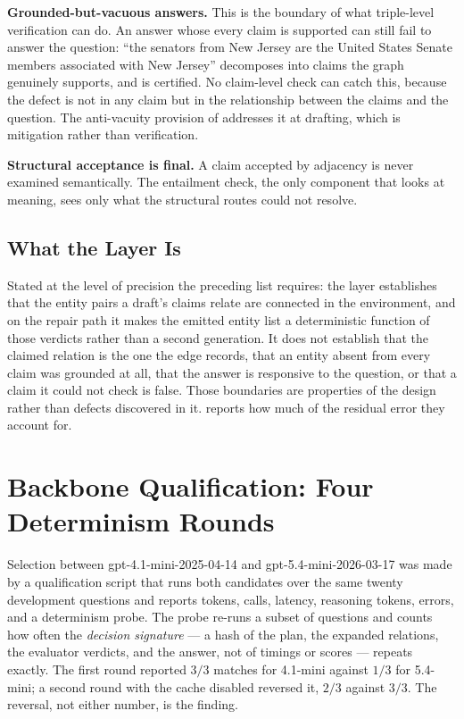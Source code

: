 \textbf{Grounded-but-vacuous answers.} This is the boundary of what triple-level
verification can do. An answer whose every claim is supported can still fail to
answer the question: ``the senators from New Jersey are the United States Senate
members associated with New Jersey'' decomposes into claims the graph genuinely
supports, and is certified. No claim-level check can catch this, because the
defect is not in any claim but in the relationship between the claims and the
question. The anti-vacuity provision of  addresses
it at drafting, which is mitigation rather than verification.

\textbf{Structural acceptance is final.} A claim accepted by adjacency is never
examined semantically. The entailment check, the only component that looks at
meaning, sees only what the structural routes could not resolve.

\subsection*{What the Layer Is}

Stated at the level of precision the preceding list requires: the layer
establishes that the entity pairs a draft's claims relate are connected in the
environment, and on the repair path it makes the emitted entity list a
deterministic function of those verdicts rather than a second generation. It
does not establish that the claimed relation is the one the edge records, that
an entity absent from every claim was grounded at all, that the answer is
responsive to the question, or that a claim it could not check is false. Those
boundaries are properties of the design rather than defects discovered in it.
 reports how much of the residual error they account
for.


\section{Backbone Qualification: Four Determinism Rounds}\label{app:backbone}

Selection between \textsf{gpt-4.1-mini-2025-04-14} and
\textsf{gpt-5.4-mini-2026-03-17} was made by a qualification script that runs
both candidates over the same twenty development questions and reports tokens,
calls, latency, reasoning tokens, errors, and a determinism probe. The probe
re-runs a subset of questions and counts how often the \emph{decision signature}
--- a hash of the plan, the expanded relations, the evaluator verdicts, and the
answer, not of timings or scores --- repeats exactly. The first round reported
$3/3$ matches for 4.1-mini against $1/3$ for 5.4-mini; a second round with the
cache disabled reversed it, $2/3$ against $3/3$. The reversal, not either
number, is the finding.

